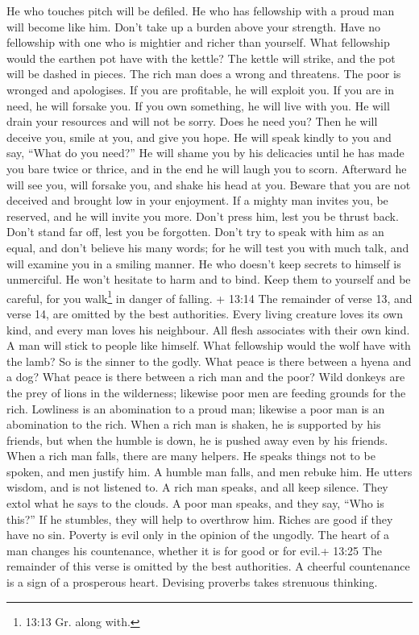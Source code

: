  He who touches pitch will be defiled. He who has fellowship
with a proud man will become like him.  Don't take up a
burden above your strength. Have no fellowship with one who is mightier
and richer than yourself. What fellowship would the earthen pot have
with the kettle? The kettle will strike, and the pot will be dashed in
pieces.  The rich man does a wrong and threatens. The poor
is wronged and apologises.  If you are profitable, he will
exploit you. If you are in need, he will forsake you.  If
you own something, he will live with you. He will drain your resources
and will not be sorry.  Does he need you? Then he will
deceive you, smile at you, and give you hope. He will speak kindly to
you and say, ``What do you need?''  He will shame you by his
delicacies until he has made you bare twice or thrice, and in the end he
will laugh you to scorn. Afterward he will see you, will forsake you,
and shake his head at you.  Beware that you are not deceived
and brought low in your enjoyment.  If a mighty man invites
you, be reserved, and he will invite you more.  Don't press
him, lest you be thrust back. Don't stand far off, lest you be
forgotten.  Don't try to speak with him as an equal, and
don't believe his many words; for he will test you with much talk, and
will examine you in a smiling manner.  He who doesn't keep
secrets to himself is unmerciful. He won't hesitate to harm and to bind.
 Keep them to yourself and be careful, for you
walk\footnote{13:13 Gr. along with.} in danger of falling. 
+ 13:14 The remainder of verse 13, and verse 14, are omitted by the best
authorities.  Every living creature loves its own kind, and
every man loves his neighbour.  All flesh associates with
their own kind. A man will stick to people like himself. 
What fellowship would the wolf have with the lamb? So is the sinner to
the godly.  What peace is there between a hyena and a dog?
What peace is there between a rich man and the poor?  Wild
donkeys are the prey of lions in the wilderness; likewise poor men are
feeding grounds for the rich.  Lowliness is an abomination
to a proud man; likewise a poor man is an abomination to the rich.
 When a rich man is shaken, he is supported by his friends,
but when the humble is down, he is pushed away even by his friends.
 When a rich man falls, there are many helpers. He speaks
things not to be spoken, and men justify him. A humble man falls, and
men rebuke him. He utters wisdom, and is not listened to. 
A rich man speaks, and all keep silence. They extol what he says to the
clouds. A poor man speaks, and they say, ``Who is this?'' If he
stumbles, they will help to overthrow him.  Riches are good
if they have no sin. Poverty is evil only in the opinion of the ungodly.
 The heart of a man changes his countenance, whether it is
for good or for evil.+ 13:25 The remainder of this verse is omitted by
the best authorities.  A cheerful countenance is a sign of
a prosperous heart. Devising proverbs takes strenuous thinking.

